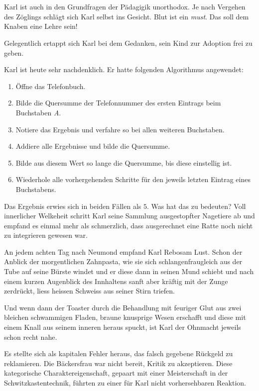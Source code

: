 \chapter*{}
Karl ist auch in den Grundfragen der Pädagigik unorthodox. Je nach Vergehen des Zöglings schlägt sich Karl selbst ins Gesicht. Blut ist ein \emph{must}. Das soll dem Knaben eine Lehre sein!

Gelegentlich ertappt sich Karl bei dem Gedanken, sein Kind zur Adoption frei zu geben.
\begin{center}
{\huge \textthing}
\end{center}
Karl ist heute sehr nachdenklich. Er hatte folgenden Algorithmus angewendet:
\begin{enumerate}
	\item Öffne das Telefonbuch.
	\item Bilde die Quersumme der Telefonnummer des ersten Eintrags beim Buchstaben \emph{A}.
	\item Notiere das Ergebnis und verfahre so bei allen weiteren Buchstaben.
	\item Addiere alle Ergebnisse und bilde die Quersumme.
	\item Bilde aus diesem Wert so lange die Quersumme, bis diese einstellig ist.
	\item Wiederhole alle vorhergehenden Schritte für den jeweils letzten Eintrag eines Buchstabens.
\end{enumerate}
Das Ergebnis erwies sich in beiden Fällen als $5$. Was hat das zu bedeuten? Voll innerlicher Welkeheit schritt Karl seine Sammlung ausgestopfter Nagetiere ab und empfand es einmal mehr als schmerzlich, dass ausgerechnet eine Ratte noch nicht zu integrieren gewesen war.
\begin{center}
{\huge \textthing}
\end{center}
An jedem achten Tag nach Neumond empfand Karl Rebosam Lust. Schon der Anblick der morgentlichen Zahnpasta, wie sie sich schlangenfraugleich aus der Tube auf seine Bürste windet und er diese dann in seinen Mund schiebt und nach einem kurzen Augenblick des Innhaltens sanft aber kräftig mit der Zunge zerdrückt, liess heissen Schweiss aus seiner Stirn triefen. 

Und wenn dann der  Toaster durch die Behandlung mit feuriger Glut aus zwei bleichen schwammigen Fladen, braune knusprige Wesen erschafft und diese mit einem Knall aus seinem inneren heraus spuckt, ist Karl der Ohnmacht jeweils schon recht nahe.
\begin{center}
{\huge \textthing}
\end{center}
Es stellte sich als kapitalen Fehler heraus, das falsch gegebene Rückgeld zu reklamieren. Die Bäckersfrau war nicht bereit, Kritik zu akzeptieren. Diese kategorische Charaktereigenschaft, gepaart mit einer Meisterschaft in der Schwitzkastentechnik, führten zu einer für Karl nicht vorhersehbaren Reaktion.

